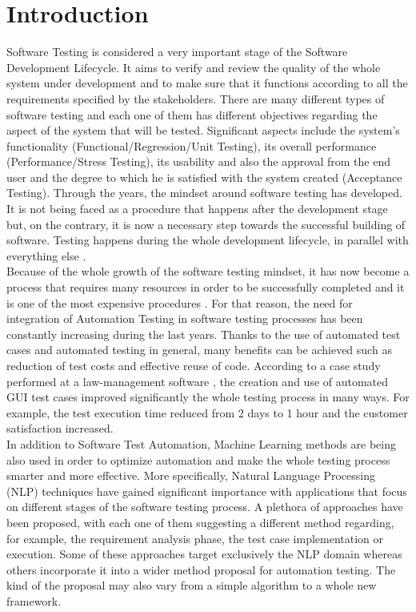 \section {Introduction}

Software Testing is considered a very important stage of the Software Development Lifecycle. It aims to verify and review the quality of the whole system 
under development and to make sure that it functions according to all the requirements specified by the stakeholders. There are many different types of software testing and each 
one of them has different objectives regarding the aspect of the system that will be tested. Significant aspects include the system's functionality 
(Functional/Regression/Unit Testing), its overall performance (Performance/Stress Testing), its usability and also the approval from the end user and 
the degree to which he is satisfied with the system created (Acceptance Testing). Through the years, the mindset around software testing 
has developed. It is not being faced as a procedure that happens after the development stage but, on the contrary, it is now a necessary 
step towards the successful building of software. Testing happens during the whole development lifecycle, in parallel with everything else \cite{swebok}.  \\

Because of the whole growth of the software testing mindset, it has now become a process that requires many resources in order to be successfully
 completed and it is one of the most expensive procedures \cite{testautomation}. For that reason, the need for integration of Automation Testing in software testing
  processes has been constantly increasing during the last years. Thanks to the use of automated test cases and automated testing in general, many benefits can be achieved such 
  as reduction of test costs and effective reuse of code. According to a case study performed at a law-management software \cite{introautotesting}, the creation and
   use of automated GUI test cases improved significantly the whole testing process in many ways. For example, the test execution time reduced from 2 days to 1 hour and the 
   customer satisfaction increased. \\

In addition to Software Test Automation, Machine Learning methods are being also used in order to optimize automation and make the whole testing process smarter and more 
effective. More specifically, Natural Language Processing (NLP) techniques have gained significant importance with applications that focus on different stages of the software testing process. 
A plethora of approaches have been proposed, with each one of them suggesting a different method regarding, for example, the requirement analysis phase, the test case implementation or execution. 
Some of these approaches target exclusively the NLP domain whereas others incorporate it into a wider method proposal for automation testing. The kind of the proposal may also vary from a simple 
algorithm to a whole new framework. \\

